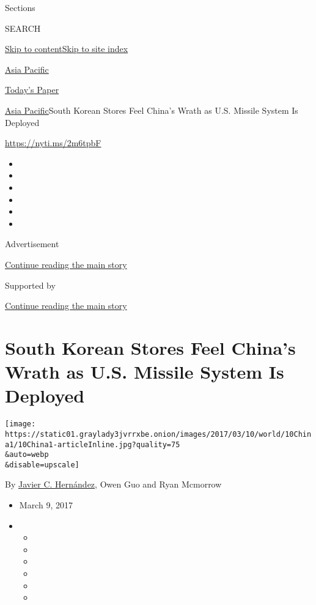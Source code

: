 Sections

SEARCH

\protect\hyperlink{site-content}{Skip to
content}\protect\hyperlink{site-index}{Skip to site index}

\href{https://www.nytimes3xbfgragh.onion/section/world/asia}{Asia
Pacific}

\href{https://myaccount.nytimes3xbfgragh.onion/auth/login?response_type=cookie\&client_id=vi}{}

\href{https://www.nytimes3xbfgragh.onion/section/todayspaper}{Today's
Paper}

\href{/section/world/asia}{Asia Pacific}\textbar{}South Korean Stores
Feel China's Wrath as U.S. Missile System Is Deployed

\url{https://nyti.ms/2m6tpbF}

\begin{itemize}
\item
\item
\item
\item
\item
\item
\end{itemize}

Advertisement

\protect\hyperlink{after-top}{Continue reading the main story}

Supported by

\protect\hyperlink{after-sponsor}{Continue reading the main story}

\hypertarget{south-korean-stores-feel-chinas-wrath-as-us-missile-system-is-deployed}{%
\section{South Korean Stores Feel China's Wrath as U.S. Missile System
Is
Deployed}\label{south-korean-stores-feel-chinas-wrath-as-us-missile-system-is-deployed}}

\texttt{[image: https://static01.graylady3jvrrxbe.onion/images/2017/03/10/world/10China1/10China1-articleInline.jpg?quality=75\\\&auto=webp\\\&disable=upscale]}

By
\href{https://www.nytimes3xbfgragh.onion/by/javier-c-hernandez}{Javier
C. Hernández}, Owen Guo and Ryan Mcmorrow

\begin{itemize}
\item
  March 9, 2017
\item
  \begin{itemize}
  \item
  \item
  \item
  \item
  \item
  \item
  \end{itemize}
\end{itemize}

